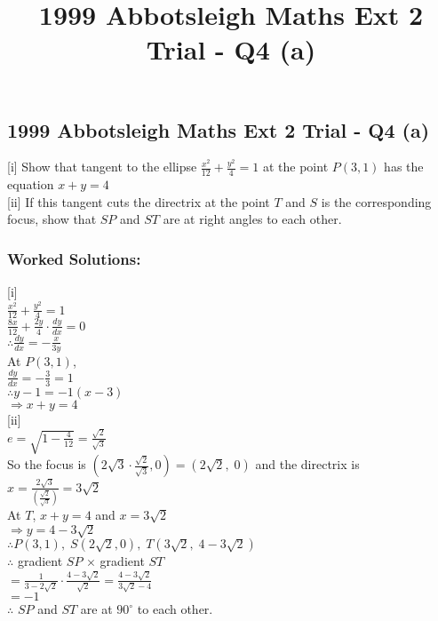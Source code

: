 \documentclass[10pt,a4paper]{report}
\title{1999 Abbotsleigh Maths Ext 2 Trial - Q4 (a)}
\theoremstyle{thm}
\begin{document}
\subsection*{1999 Abbotsleigh Maths Ext 2 Trial - Q4 (a)}
[i] Show that tangent to the ellipse $\displaystyle\frac{x^2}{12} + 
\frac{y^2}{4} = 1$ at the point $P\left(3,1\right)$ has the equation $x 
+ y = 4$\\[1em]
[ii] If this tangent cuts the directrix at the point $T$ and $S$ is the 
corresponding focus, show that $SP$ and $ST$ are at right angles to each 
other.\\
\subsubsection{Worked Solutions:}
[i]\\
$\frac{{x^2}}{12} + \frac{{y^2}}{4} = 1$\\
$\frac{8x}{12} + \frac{2y}{4} \cdot \frac{dy}{dx} = 0$\\
$\therefore \frac{dy}{dx} =  - \frac{x}{3y}$\\[1em]
At $P\left(3,1\right)$, \\
$\frac{dy}{dx} =  - \frac{3}{3} = 1$\\
$\therefore y - 1 =  - 1\left( {x - 3} \right)$\\
$ \Rightarrow x + y = 4$\\[1em]
[ii]\\
$e = \sqrt {1 - \frac{4}{12}}  = \frac{\sqrt 2 }{\sqrt 3 }$\\
So the focus is $\left(2\sqrt 3  \cdot \frac{\sqrt 2 }{\sqrt 3 },0 \right) = \left(2\sqrt 2 ,\;0 \right)$ and the directrix is $x = \frac{2\sqrt 3 }{\left( \frac{\sqrt 2 }{\sqrt 3 } \right)} = 3\sqrt 2 $\\[1em]
At $T$, $x + y = 4$ and $x = 3\sqrt 2 $\\
$ \Rightarrow y = 4 - 3\sqrt 2 $\\
$\therefore P\left( {3,1} \right),\;S\left(2\sqrt 2 ,0 \right),\;T\left(3\sqrt 2 ,\;4 - 3\sqrt 2 \right)$\\[1em]
$\therefore $ gradient $SP$ $ \times $ gradient $ST$\\
$ = \frac{1}{3 - 2\sqrt 2 } \cdot \frac{4 - 3\sqrt 2 }{\sqrt 2 } = \frac{4 - 3\sqrt 2 }{3\sqrt 2  - 4}$\\
$ =  - 1$\\[1em]
$\therefore $ $SP$ and $ST$ are at $90^\circ $ to each other.\\
\end{document}
